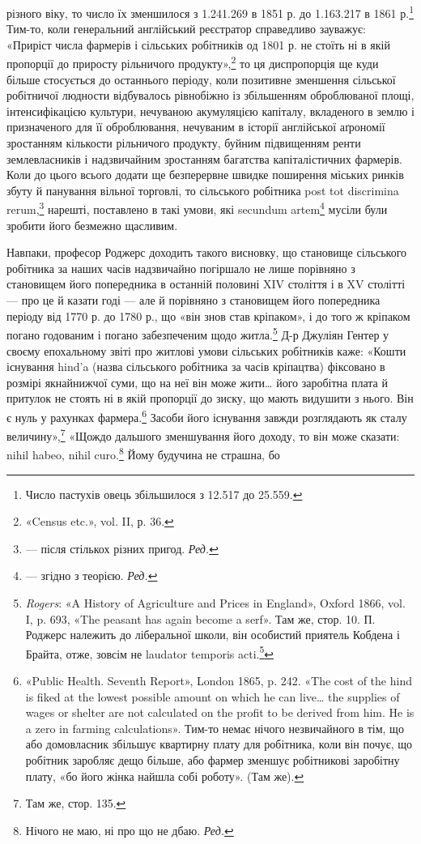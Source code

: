 \parcont{}  %
різного віку, то число їх зменшилося з \num{1.241.269} в 1851 р. до
\num{1.163.217} в 1861 р.\footnote{
Число пастухів овець збільшилося з \num{12.517} до \num{25.559}.
} Тим-то, коли генеральний англійський
реєстратор справедливо зауважує: «Приріст числа фармерів і
сільських робітників од 1801 р. не стоїть ні в якій пропорції
до приросту рільничого продукту»,\footnote{
«Census etc.», vol. II, р. 36.
} то ця диспропорція ще
куди більше стосується до останнього періоду, коли позитивне
зменшення сільської робітничої людности відбувалось рівнобіжно
із збільшенням оброблюваної площі, інтенсифікацією культури,
нечуваною акумуляцією капіталу, вкладеного в землю і призначеного
для її оброблювання, нечуваним в історії англійської
аґрономії зростанням кількости рільничого продукту, буйним
підвищенням ренти землевласників і надзвичайним зростанням
багатства капіталістичних фармерів. Коли до цього всього додати
ще безперервне швидке поширення міських ринків збуту й
панування вільної торговлі, то сільського робітника post tot
discrimina rerum,\footnote*{
— після стількох різних пригод. \emph{Ред.}
} нарешті, поставлено в такі умови, які secundum
artem\footnote*{
— згідно з теорією. \emph{Ред.}
} мусіли були зробити його безмежно щасливим.

Навпаки, професор Роджерс доходить такого висновку, що
становище сільського робітника за наших часів надзвичайно
погіршало не лише порівняно з становищем його попередника
в останній половині XIV століття і в XV столітті — про це й
казати годі — але й порівняно з становищем його попередника
періоду від 1770 р. до 1780 р., що «він знов став кріпаком», і
до того ж кріпаком погано годованим і погано забезпеченим щодо
житла.\footnote{
\emph{Rogers}: «A History of Agriculture and Prices in England», Oxford
1866, vol. I, p. 693, «The peasant has again become a serf». Там же, стор. 10.
П. Роджерс належить до ліберальної школи, він особистий приятель
Кобдена і Брайта, отже, зовсім не laudator temporis acti.\footnote*{
— хвалій минулих часів. \emph{Ред.}
}
} Д-р Джуліян Гентер у своєму епохальному звіті про
житлові умови сільських робітників каже: «Кошти існування
hind’a (назва сільського робітника за часів кріпацтва) фіксовано
в розмірі якнайнижчої суми, що на неї він може жити\dots{} його
заробітна плата й притулок не стоять ні в якій пропорції до зиску,
що мають видушити з нього. Він є нуль у рахунках фармера.\footnote{
«Public Health. Seventh Report», London 1865, p. 242. «The cost of
the hind is fiked at the lowest possible amount on which he can live\dots{} the
supplies of wages or shelter are not calculated on the profit to be derived
from him. He is a zero in farming calculations». Тим-то немає нічого незвичайного
в тім, що або домовласник збільшує квартирну плату для робітника,
коли він почує, що робітник заробляє дещо більше, або фармер
зменшує робітникові заробітну плату, «бо його жінка найшла собі
роботу». (Там же).
}
Засоби його існування завжди розглядають як сталу величину»,\footnote{
Там же, стор. 135.
}
«Щождо дальшого зменшування його доходу, то він може сказати:
nihil habeo, nihil curo.\footnote*{
Нічого не маю, ні про що не дбаю. \emph{Ред.}
} Йому будучина не страшна, бо
\parbreak{}  %
